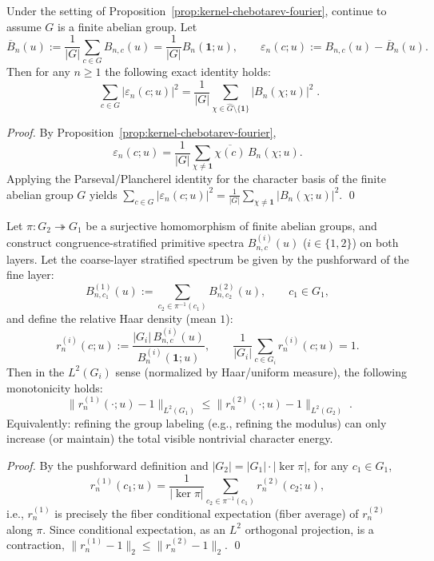 \begin{corollary}[Chebotarev--Plancherel energy identity: spatial mean-square deviation \texorpdfstring{$=$}{=} character-side energy sum]\label{cor:kernel-chebotarev-plancherel-energy}
Under the setting of Proposition~\ref{prop:kernel-chebotarev-fourier}, continue to assume \(G\) is a finite abelian group.
Let
\[
\overline{B}_n(u):=\frac{1}{|G|}\sum_{c\in G}B_{n,c}(u)=\frac{1}{|G|}B_n(\mathbf{1};u),
\qquad
\varepsilon_n(c;u):=B_{n,c}(u)-\overline{B}_n(u).
\]
Then for any \(n\ge 1\) the following exact identity holds:
\[
\boxed{\;
\sum_{c\in G}\bigl|\varepsilon_n(c;u)\bigr|^2
=\frac{1}{|G|}\sum_{\chi\in\widehat G\setminus\{\mathbf{1}\}}\bigl|B_n(\chi;u)\bigr|^2\; }.
\]
\end{corollary}
\begin{proof}
By Proposition~\ref{prop:kernel-chebotarev-fourier},
\[
\varepsilon_n(c;u)
=\frac{1}{|G|}\sum_{\chi\ne \mathbf{1}}\overline{\chi(c)}\,B_n(\chi;u).
\]
Applying the Parseval/Plancherel identity for the character basis of the finite abelian group \(G\) yields
\(
\sum_{c\in G}|\varepsilon_n(c;u)|^2=\frac{1}{|G|}\sum_{\chi\ne\mathbf{1}}|B_n(\chi;u)|^2
\). \qed
\end{proof}

\begin{corollary}\label{cor:kernel-chebotarev-L2-monotone}
Let \(\pi:G_2\twoheadrightarrow G_1\) be a surjective homomorphism of finite abelian groups, and construct congruence-stratified primitive spectra \(B^{(i)}_{n,c}(u)\) (\(i\in\{1,2\}\)) on both layers.
Let the coarse-layer stratified spectrum be given by the pushforward of the fine layer:
\[
B^{(1)}_{n,c_1}(u):=\sum_{c_2\in \pi^{-1}(c_1)}B^{(2)}_{n,c_2}(u),
\qquad c_1\in G_1,
\]
and define the relative Haar density (mean $1$):
\[
r^{(i)}_{n}(c;u):=\frac{|G_i|\,B^{(i)}_{n,c}(u)}{B^{(i)}_{n}(\mathbf{1};u)},
\qquad
\frac{1}{|G_i|}\sum_{c\in G_i}r^{(i)}_{n}(c;u)=1.
\]
Then in the \(L^2(G_i)\) sense (normalized by Haar/uniform measure), the following monotonicity holds:
\[
\boxed{\;
\bigl\|r^{(1)}_{n}(\cdot;u)-1\bigr\|_{L^2(G_1)}
\le
\bigl\|r^{(2)}_{n}(\cdot;u)-1\bigr\|_{L^2(G_2)}\; }.
\]
Equivalently: refining the group labeling (e.g., refining the modulus) can only increase (or maintain) the total visible nontrivial character energy.
\end{corollary}
\begin{proof}
By the pushforward definition and \(|G_2|=|G_1|\cdot|\ker\pi|\), for any \(c_1\in G_1\),
\[
r^{(1)}_{n}(c_1;u)
=\frac{1}{|\ker\pi|}\sum_{c_2\in\pi^{-1}(c_1)}r^{(2)}_{n}(c_2;u),
\]
i.e., \(r^{(1)}_{n}\) is precisely the fiber conditional expectation (fiber average) of \(r^{(2)}_{n}\) along \(\pi\).
Since conditional expectation, as an \(L^2\) orthogonal projection, is a contraction,
\(
\|r^{(1)}_{n}-1\|_{2}\le \|r^{(2)}_{n}-1\|_{2}
\). \qed
\end{proof}

